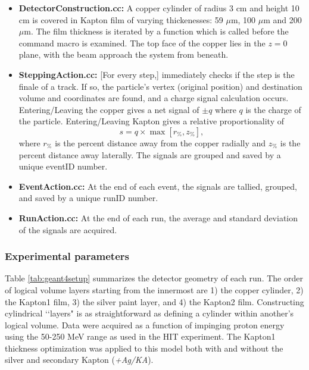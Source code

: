 \documentclass{mc2015}
\begin{document}
\begin{itemize}
\item \textbf{DetectorConstruction.cc:} A copper cylinder of radius 3 cm and height 10 cm is covered in Kapton film of varying thickenesses: 59 $\mu$m, 100 $\mu$m and 200 $\mu$m.  The film thickness is iterated by a function which is called before the command macro is examined.  The top face of the copper lies in the $z=0$ plane, with the beam approach the system from beneath.
\item \textbf{SteppingAction.cc:} [For every step,] immediately checks if the step is the finale of a track.  If so, the particle's vertex (original position) and destination volume and coordinates are found, and a charge signal calculation occurs.  Entering/Leaving the copper gives a net signal of $\pm q$ where $q$ is the charge of the particle.  Entering/Leaving Kapton gives a relative proportionality of
$$ s = q\times\max\left[r_{\%}, z_{\%}\right], $$
where $r_{\%}$ is the percent distance away from the copper radially and $z_{\%}$ is the percent distance away laterally.  The signals are grouped and saved by a unique eventID number.
\item \textbf{EventAction.cc:} At the end of each event, the signals are tallied, grouped, and saved by a unique runID number.
\item \textbf{RunAction.cc:} At the end of each run, the average and standard deviation of the signals are acquired.
\end{itemize}

\subsubsection{Experimental parameters}

Table \ref{tab:geant4setup} summarizes the detector geometry of each run.  The order of logical volume layers starting from the innermost are 1) the copper cylinder, 2) the Kapton1 film, 3) the silver paint layer, and 4) the Kapton2 film.  Constructing cylindrical \lq\lq layers" is as straightforward as defining a cylinder within another's logical volume.  Data were acquired as a function of impinging proton energy using the 50-250 MeV range as used in the HIT experiment.  The Kapton1 thickness optimization was applied to this model both with and without the silver and secondary Kapton (\emph{+Ag/KA}).
\end{document}
